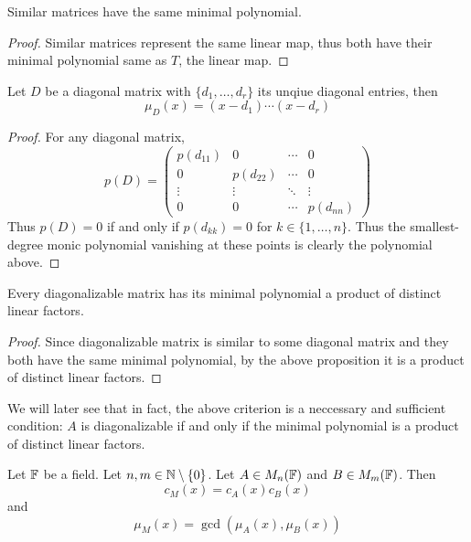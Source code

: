 \documentclass[a4paper]{article}
\begin{document}
\begin{prp}{}{} Similar matrices have the same minimal polynomial. \begin{proof} Similar matrices represent the same linear map, thus both have their minimal polynomial same as $T$, the linear map. 
\end{proof}
\end{prp}

\begin{prp}{}{} Let $D$ be a diagonal matrix with $\{d_1,\dots,d_r\}$ its unqiue diagonal entries, then $$\mu_D(x)=(x-d_1)\cdots(x-d_r)$$
\begin{proof} For any diagonal matrix, $$p(D)=\begin{pmatrix}p(d_{11}) & 0 & \cdots & 0\\ 0 & p(d_{22}) & \cdots & 0 \\ \vdots & \vdots & \ddots & \vdots\\ 0 & 0 & \cdots & p(d_{nn})\end{pmatrix}$$ Thus $p(D)=0$ if and only if $p(d_{kk})=0$ for $k\in\{1,\dots,n\}$. Thus the smallest-degree monic polynomial vanishing at these points is clearly the polynomial above. 
\end{proof}
\end{prp}

\begin{crl}{}{} Every diagonalizable matrix has its minimal polynomial a product of distinct linear factors. 
\begin{proof} Since diagonalizable matrix is similar to some diagonal matrix and they both have the same minimal polynomial, by the above proposition it is a product of distinct linear factors. 
\end{proof}
\end{crl}

We will later see that in fact, the above criterion is a neccessary and sufficient condition: $A$ is diagonalizable if and only if the minimal polynomial is a product of distinct linear factors. 

\begin{lmm}{}{} Let $\mathbb{F}$ be a field. Let $n,m\in\mathbb{N}\setminus\{0\}$. Let $A\in M_n(\mathbb{F})$ and $B\in M_m(\mathbb{F})$. Then $$c_M(x)=c_A(x)c_B(x)$$ and $$\mu_M(x)=\gcd(\mu_A(x),\mu_B(x))$$
\end{lmm}
\end{document}
